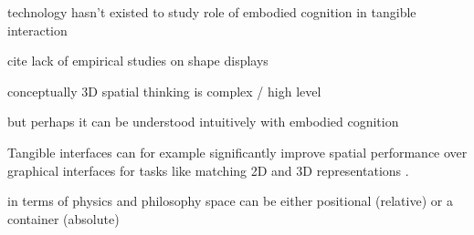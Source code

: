 





technology hasn't existed to study
role of embodied cognition 
in tangible interaction

cite lack of empirical studies on shape displays











conceptually
3D spatial thinking is complex / high level

but perhaps it can be understood intuitively 
with embodied cognition



Tangible interfaces can
for example
significantly improve 
spatial performance over graphical interfaces 
for tasks like matching 2D and 3D representations \cite{Cuendet2012}.




in terms of physics and philosophy
space
can be either positional (relative) or a container (absolute)
















